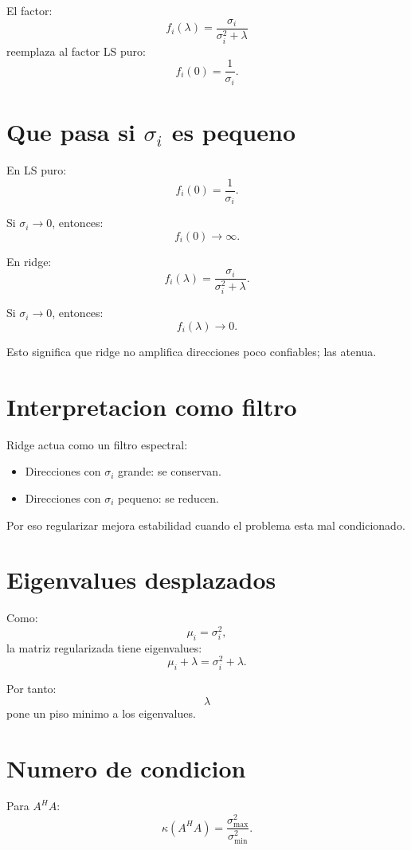 \documentclass[11pt]{article}
\begin{document}
El factor:
\[
    f_i(\lambda)
    =
    \frac{\sigma_i}{\sigma_i^2+\lambda}
\]
reemplaza al factor LS puro:
\[
    f_i(0) = \frac{1}{\sigma_i}.
\]

\section{Que pasa si \(\sigma_i\) es pequeno}

En LS puro:
\[
    f_i(0)=\frac{1}{\sigma_i}.
\]

Si \(\sigma_i\to 0\), entonces:
\[
    f_i(0)\to\infty.
\]

En ridge:
\[
    f_i(\lambda)
    =
    \frac{\sigma_i}{\sigma_i^2+\lambda}.
\]

Si \(\sigma_i\to 0\), entonces:
\[
    f_i(\lambda)\to 0.
\]

Esto significa que ridge no amplifica direcciones poco confiables; las atenua.

\section{Interpretacion como filtro}

Ridge actua como un filtro espectral:

\begin{itemize}
    \item Direcciones con \(\sigma_i\) grande: se conservan.
    \item Direcciones con \(\sigma_i\) pequeno: se reducen.
\end{itemize}

Por eso regularizar mejora estabilidad cuando el problema esta mal condicionado.

\section{Eigenvalues desplazados}

Como:
\[
    \mu_i = \sigma_i^2,
\]
la matriz regularizada tiene eigenvalues:
\[
    \mu_i+\lambda
    =
    \sigma_i^2+\lambda.
\]

Por tanto:
\[
    \lambda
\]
pone un piso minimo a los eigenvalues.

\section{Numero de condicion}

Para \(A^H A\):
\[
    \kappa(A^H A)
    =
    \frac{\sigma_{\max}^2}{\sigma_{\min}^2}.
\]
\end{document}

